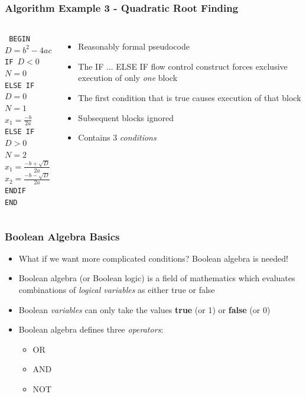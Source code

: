 \documentclass[14pt]{beamer}
\begin{document}
\begin{frame}[fragile] %
\frametitle{Algorithm Example 3 - Quadratic Root Finding}
\begin{columns}
\column{1.5in}
{\footnotesize
\texttt{
BEGIN\\
\quad  $D = b^2 - 4 a c$\\
\quad	IF $D < 0$\\
\quad\quad		$N = 0$\\
\quad	ELSE IF $D = 0$\\
\quad\quad		$N = 1$\\
\quad\quad		$x_1 = \frac{-b}{2a}$\\
\quad	ELSE IF $D > 0$\\
\quad\quad		$N = 2$\\
\quad\quad		$x_1 = \frac{-b + \sqrt{D}}{2a}$\\
\quad\quad		$x_2 = \frac{-b - \sqrt{D}}{2a}$\\
\quad	ENDIF\\
END\\
}
}
\column{3in}
\begin{itemize}
\item Reasonably formal pseudocode
\item The IF ... ELSE IF flow control construct forces exclusive execution of only \textit{one} block
\item The first condition that is true causes execution of that block
\item Subsequent blocks ignored
\item Contains 3 \textit{conditions}
\end{itemize}
\end{columns}
\end{frame}

\begin{frame} %
\frametitle{Boolean Algebra Basics}
\begin{itemize}
\item What if we want more complicated conditions? Boolean algebra is needed!
\item Boolean algebra (or Boolean logic) is a field of mathematics which evaluates combinations of \textit{logical variables} as either true or false
\item Boolean \textit{variables} can only take the values \textbf{true} (or 1) or \textbf{false} (or 0)
\item Boolean algebra defines three \textit{operators}:
	\begin{itemize}
		\item OR
		\item AND
		\item NOT
	\end{itemize}
\end{itemize}
\end{frame}
\end{document}
